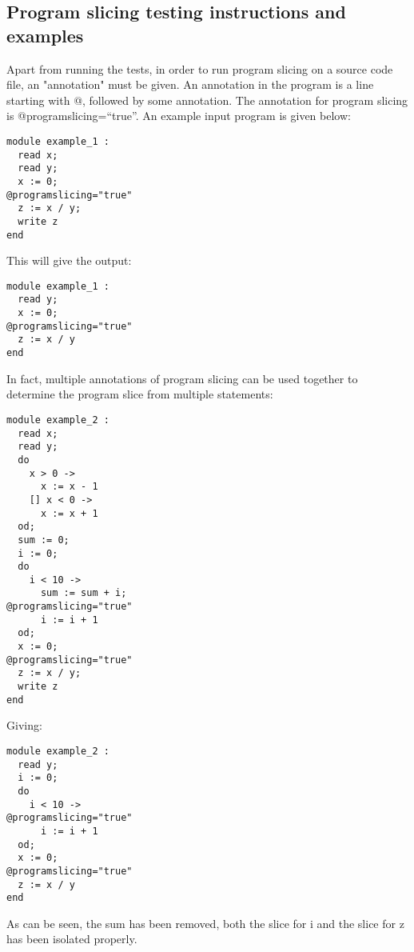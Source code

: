 
\subsection{Program slicing testing instructions and examples}
\label{ps_test_examples}

Apart from running the tests, in order to run program slicing
on a source code file, an "annotation" must be given. An annotation in the program
is a line starting with @, followed by some annotation.
The annotation for program slicing is @programslicing=``true''.
An example input program is given below:

\begin{lstlisting}
module example_1 :
  read x;
  read y;
  x := 0;
@programslicing="true"
  z := x / y;
  write z
end
\end{lstlisting}

This will give the output:

\begin{lstlisting}
module example_1 :
  read y;
  x := 0;
@programslicing="true"
  z := x / y
end
\end{lstlisting}

In fact, multiple annotations of program slicing can be used together
to determine the program slice from multiple statements:

\begin{lstlisting}
module example_2 :
  read x;
  read y;
  do
    x > 0 ->
      x := x - 1
    [] x < 0 ->
      x := x + 1
  od;
  sum := 0;
  i := 0;
  do
    i < 10 ->
      sum := sum + i;
@programslicing="true"
      i := i + 1
  od;
  x := 0;
@programslicing="true"
  z := x / y;
  write z
end
\end{lstlisting}

Giving:

\begin{lstlisting}
module example_2 :
  read y;
  i := 0;
  do
    i < 10 ->
@programslicing="true"
      i := i + 1
  od;
  x := 0;
@programslicing="true"
  z := x / y
end
\end{lstlisting}

As can be seen, the sum has been removed, both the slice for i
and the slice for z has been isolated properly.

